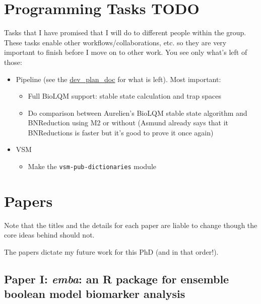 \documentclass[12pt,]{book}
\providecommand{\tightlist}{%
  \setlength{\itemsep}{0pt}\setlength{\parskip}{0pt}}
\begin{document}
\hypertarget{programming-tasks-todo}{%
\section{Programming Tasks TODO}\label{programming-tasks-todo}}

Tasks that I have promised that I will do to different people within the group.
These tasks enable other workflows/collaborations, etc. so they are very
important to finish before I move on to other work. You see only what's left of
those:

\begin{itemize}
\tightlist
\item
  Pipeline (see the \href{https://docs.google.com/document/d/1OUupR0b-28YB9pVAww77RMecnFN6A39MYjXMjljmvG4/edit?usp=sharing}{dev\_plan\_doc} for what is left). Most important:

  \begin{itemize}
  \tightlist
  \item
    Full BioLQM support: stable state calculation and trap spaces
  \item
    Do comparison between Aurelien's BioLQM stable state algorithm and
    BNReduction using M2 or without (Asmund already says that it BNReductions is faster
    but it's good to prove it once again)
  \end{itemize}
\item
  VSM

  \begin{itemize}
  \tightlist
  \item
    Make the \texttt{vsm-pub-dictionaries} module
  \end{itemize}
\end{itemize}

\hypertarget{papers}{%
\section{Papers}\label{papers}}

Note that the titles and the details for each paper are liable to change though the core ideas behind should not.

The papers dictate my future work for this PhD (and in that order!).

\hypertarget{paper-i-emba-an-r-package-for-ensemble-boolean-model-biomarker-analysis}{%
\subsection*{\texorpdfstring{Paper I: \emph{emba}: an R package for ensemble boolean model biomarker analysis}{Paper I: emba: an R package for ensemble boolean model biomarker analysis}}\label{paper-i-emba-an-r-package-for-ensemble-boolean-model-biomarker-analysis}}
\end{document}
